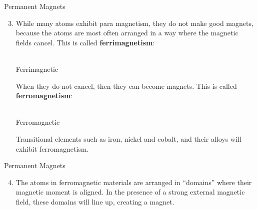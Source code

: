 \documentclass[12pt,aspectratio=169]{beamer}
\begin{document}
\begin{frame}{Permanent Magnets}
  \begin{enumerate}
    \setcounter{enumi}{2}
  \item While many atoms exhibit para magnetism, they do not make good magnets,
    because the atoms are most often arranged in a way where the magnetic fields
    cancel. This is called \textbf{ferrimagnetism}:
    \begin{center}
      \\
      Ferrimagnetic
    \end{center}
    When they do not cancel, then they can become magnets. This is called
    \textbf{ferromagnetism}:
    \begin{center}
      \\
      Ferromagnetic
    \end{center}
    Transitional elements such as iron, nickel and cobalt, and their alloys
    will exhibit ferromagnetism.
  \end{enumerate}
\end{frame}



\begin{frame}{Permanent Magnets}
  \begin{enumerate}
    \setcounter{enumi}{3}
  \item The atoms in ferromagnetic materials are arranged in ``domains'' where
    their magnetic moment is aligned. In the presence of a strong external
    magnetic field, these domains will line up, creating a magnet.
    \begin{center}
    \end{center}
  \end{enumerate}
\end{frame}
\end{document}
